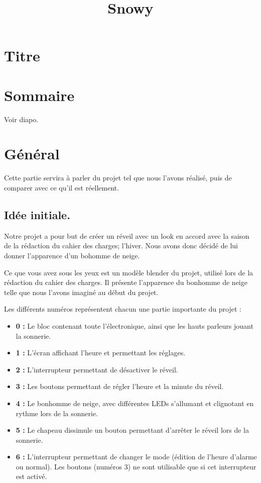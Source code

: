 \documentclass{article}
\title{Snowy}
\begin{document}
\maketitle

\section{Titre}

\section{Sommaire}
Voir diapo.

\section{Général}
Cette partie servira à parler du projet tel que nous l'avons réalisé, puis de comparer avec ce qu'il est réellement.

\subsection{Idée initiale.}
Notre projet a pour but de créer un réveil avec un look en accord avec la saison de la rédaction du cahier des charges; l'hiver. Nous avons donc décidé de lui donner l'apparence d'un bohomme de neige.

Ce que vous avez sous les yeux est un modèle blender du projet, utilisé lors de la rédaction du cahier des charges. Il présente l'apparence du bonhomme de neige telle que nous l'avons imaginé au début du projet.

Les différents numéros représentent chacun une partie importante du projet :
\begin{itemize}
	\item \textbf{0 :} Le bloc contenant toute l'électronique, ainsi que les hauts parleurs jouant la sonnerie.
	\item \textbf{1 :} L'écran affichant l'heure et permettant les réglages.
	\item \textbf{2 :} L'interrupteur permettant de désactiver le réveil.
	\item \textbf{3 :} Les boutons permettant de régler l'heure et la minute du réveil.
	\item \textbf{4 :} Le bonhomme de neige, avec différentes LEDs s'allumant et clignotant en rythme lors de la sonnerie.
	\item \textbf{5 :} Le chapeau dissimule un bouton permettant d'arrêter le réveil lors de la sonnerie.
	\item \textbf{6 :} L'interrupteur permettant de changer le mode (édition de l'heure d'alarme ou normal). Les boutons (numéros 3) ne sont utilisable que si cet interrupteur est activé.
\end{itemize}
\end{document}
